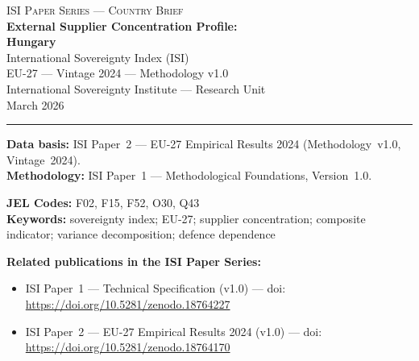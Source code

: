 \documentclass[12pt,a4paper]{article}
\begin{document}
\hypersetup{pageanchor=false}

\begin{titlepage}
\centering
\vspace*{2cm}
{\Large\textsc{ISI Paper Series --- Country Brief}}\\[1.2cm]
{\LARGE\bfseries External Supplier Concentration Profile:\\[0.3em]
Hungary}\\[1.5cm]
{\large International Sovereignty Index (ISI)\\[0.3em]
EU-27 --- Vintage 2024 --- Methodology v1.0}\\[1.2cm]
{\large International Sovereignty Institute --- Research Unit}\\[0.8cm]
{\large March 2026}

\vspace{0.8cm}
\noindent\rule{\textwidth}{0.4pt}
\vspace{0.4cm}

\begin{flushleft}
\noindent\textbf{Data basis:} ISI Paper~2 --- EU-27 Empirical Results 2024 (Methodology~v1.0, Vintage~2024).\\[4pt]
\noindent\textbf{Methodology:} ISI Paper~1 --- Methodological Foundations, Version~1.0.

\medskip

\noindent\textbf{JEL Codes:} F02, F15, F52, O30, Q43\\[4pt]
\noindent\textbf{Keywords:} sovereignty index; EU-27; supplier concentration; composite indicator; variance decomposition; defence dependence

\medskip

\noindent\textbf{Related publications in the ISI Paper Series:}
\begin{itemize}[nosep,leftmargin=1.5em]
\item ISI Paper~1 --- Technical Specification (v1.0) --- doi:\\
  \url{https://doi.org/10.5281/zenodo.18764227}
\item ISI Paper~2 --- EU-27 Empirical Results 2024 (v1.0) --- doi:\\
  \url{https://doi.org/10.5281/zenodo.18764170}
\end{itemize}
\end{flushleft}
\vfill
\end{titlepage}
\end{document}

